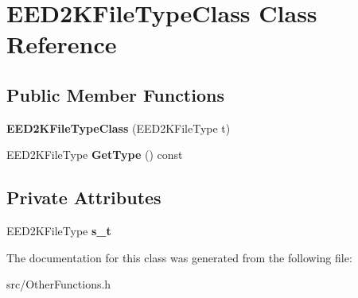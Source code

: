 \section{EED2KFileTypeClass Class Reference}
\label{classEED2KFileTypeClass}
\subsection*{Public Member Functions}
\begin{DoxyCompactItemize}
\item 
{\bfseries EED2KFileTypeClass} (EED2KFileType t)\label{classEED2KFileTypeClass_ac46c3e46b65145f9fc2fe03a6aaf835e}

\item 
EED2KFileType {\bfseries GetType} () const \label{classEED2KFileTypeClass_adbd48e0ec505794a87ec1f813fd6b740}

\end{DoxyCompactItemize}
\subsection*{Private Attributes}
\begin{DoxyCompactItemize}
\item 
EED2KFileType {\bfseries s\_\-t}\label{classEED2KFileTypeClass_a71194eda39893c1aaee5eef560ab6926}

\end{DoxyCompactItemize}


The documentation for this class was generated from the following file:\begin{DoxyCompactItemize}
\item 
src/OtherFunctions.h\end{DoxyCompactItemize}
